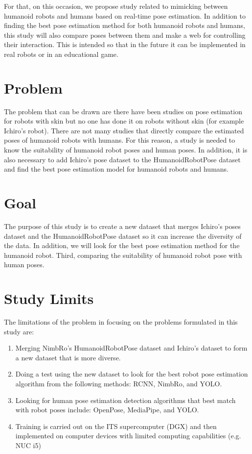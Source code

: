 For that, on this occasion, we propose study related to mimicking between humanoid robots and humans based on real-time pose estimation. 
In addition to finding the best pose estimation method for both humanoid robots and humans, this study will also compare poses between them and make a web for controlling their interaction.
This is intended so that in the future it can be implemented in real robots or in an educational game.

\section{Problem}
\label{sec:problem}

The problem that can be drawn are there have been studies on pose estimation for robots with skin but no one has done it on robots without skin (for example Ichiro's robot).
There are not many studies that directly compare the estimated poses of humanoid robots with humans. 
For this reason, a study is needed to know the suitability of humanoid robot poses and human poses. 
In addition, it is also necessary to add Ichiro's pose dataset to the HumanoidRobotPose dataset and find the best pose estimation model for humanoid robots and humans.

\section{Goal}
\label{sec:goal}

The purpose of this study is to create a new dataset that merges Ichiro's poses dataset and the HumanoidRobotPose dataset so it can increase the diversity of the data. In addition,
we will look for the best pose estimation method for the humanoid robot. Third, comparing the suitability of humanoid robot pose with human poses.

\section{Study Limits}
\label{sec:studylimits}

The limitations of the problem in focusing on the problems formulated in this study are:

\begin{enumerate}[nolistsep]

  \item Merging NimbRo's HumanoidRobotPose dataset and Ichiro's dataset to form a new dataset that is more diverse.
  \item Doing a test using the new dataset to look for the best robot pose estimation algorithm from the following methods: RCNN, NimbRo, and YOLO.
  \item Looking for human pose estimation detection algorithms that best match with robot poses include: OpenPose, MediaPipe, and YOLO.
  \item Training is carried out on the ITS supercomputer (DGX) and then implemented on computer devices with limited computing capabilities (e.g. NUC i5)

\end{enumerate}

